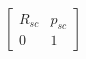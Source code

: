 \documentclass[preview]{standalone}
\begin{document}
\begin{center}
$ \begin{bmatrix}R_{sc} & p_{sc} \\ 0 & 1 \end{bmatrix}$
\end{center}
\end{document}
